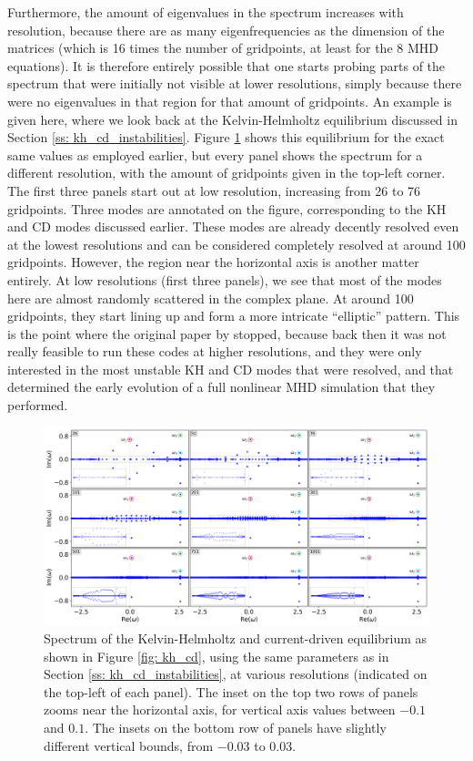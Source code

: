 Furthermore, the amount of eigenvalues in the spectrum increases with resolution, because there are as many eigenfrequencies as the dimension of the matrices (which is 16 times the number of gridpoints, at least for the 8 MHD equations). It is therefore entirely possible that one starts probing parts of the spectrum that were initially not visible at lower resolutions, simply because there were no eigenvalues in that region for that amount of gridpoints. An example is given here, where we look back at the Kelvin-Helmholtz equilibrium discussed in Section \ref{ss: kh_cd_instabilities}. Figure \ref{fig: convergence} shows this equilibrium for the exact same values as employed earlier, but every panel shows the spectrum for a different resolution, with the amount of gridpoints given in the top-left corner. The first three panels start out at low resolution, increasing from 26 to 76 gridpoints. Three modes are annotated on the figure, corresponding to the KH and CD modes discussed earlier. These modes are already decently resolved even at the lowest resolutions and can be considered completely resolved at around 100 gridpoints. However, the region near the horizontal axis is another matter entirely. At low resolutions (first three panels), we see that most of the modes here are almost randomly scattered in the complex plane. At around 100 gridpoints, they start lining up and form a more intricate ``elliptic'' pattern. This is the point where the original paper by \citet{baty2002} stopped, because back then it was not really feasible to run these codes at higher resolutions, and they were only interested in the most unstable KH and CD modes that were resolved, and that determined the early evolution of a full nonlinear MHD simulation that they performed.

\begin{figure}[t]
  \centering
  \includegraphics[width=\textwidth]{convergence.png}
  \caption{
    Spectrum of the Kelvin-Helmholtz and current-driven equilibrium as shown in Figure \ref{fig: kh_cd}, using the same parameters as in Section \ref{ss: kh_cd_instabilities}, at various resolutions (indicated on the top-left of each panel). The inset on the top two rows of panels zooms near the horizontal axis, for vertical axis values between $-0.1$ and $0.1$. The insets on the bottom row of panels have slightly different vertical bounds, from $-0.03$ to $0.03$.
  }
  \label{fig: convergence}
\end{figure}

